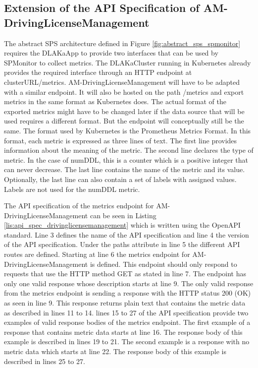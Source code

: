 \subsection{Extension of the API Specification of AM-DrivingLicenseManagement}

The abstract SPS architecture defined in Figure
\ref{fig:abstract_sps_spmonitor} requires the DLAKaApp to provide two
interfaces that can be used by SPMonitor to collect metrics. The DLAKaCluster
running in Kubernetes already provides the required interface through an HTTP
endpoint at clusterURL/metrics. AM-DrivingLicenseManagement will have to be adapted with a similar endpoint. It
will also be hosted on the path /metrics and export metrics in the same format
as Kubernetes does. The actual format of the exported metrics might have to be
changed later if the data source that will be used requires a different format.
But the endpoint will conceptually still be the same. The format used by
Kubernetes is the Prometheus Metrics Format. In this format, each metric is
expressed as three lines of text. The first line provides information about the
meaning of the metric. The second line declares the type of metric. In the case
of numDDL, this is a counter which is a positive integer that can never
decrease. The last line contains the name of the metric and its value.
Optionally, the last line can also contain a set of labels with assigned
values. Labels are not used for the numDDL metric. 

The API specification of the metrics endpoint for AM-DrivingLicenseManagement can be seen in Listing
\ref{lis:api_spec_drivinglicensemanagement} which is written using the OpenAPI
standard. Line 3 defines the name of the API specification and line 4 the version of the API specification.
Under the paths attribute in line 5 the different API routes are defined.
Starting at line 6 the metrics endpoint for AM-DrivingLicenseManagement is defined.
This endpoint should only respond to requests that use the HTTP method GET as stated in line 7.
The endpoint has only one valid response whose description starts at line 9.
The only valid response from the metrics endpoint is sending a response with the HTTP status 200 (OK) as seen in line 9.
This response returns plain text that contains the metric data as described in lines 11 to 14.
lines 15 to 27 of the API specification provide two examples of valid response bodies of the metrics endpoint.
The first example of a response that contains metric data starts at line 16. The response body of this example
is described in lines 19 to 21. The second example is a response with no metric data which starts at line 22.
The response body of this example is described in lines 25 to 27.

